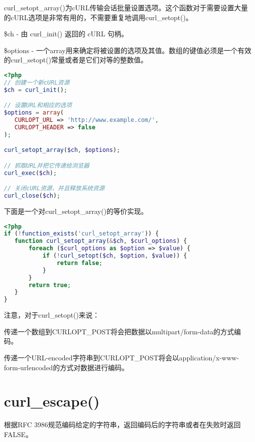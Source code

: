 curl\_setopt\_array()为cURL传输会话批量设置选项。这个函数对于需要设置大量的cURL选项是非常有用的，不需要重复地调用curl\_setopt()。

\begin{compactitem}
\item \$ch - 由 curl\_init() 返回的 cURL 句柄。

\item \$options - 一个array用来确定将被设置的选项及其值。数组的键值必须是一个有效的curl\_setopt()常量或者是它们对等的整数值。
\end{compactitem}

\begin{lstlisting}[language=PHP]
<?php
// 创建一个新cURL资源
$ch = curl_init();

// 设置URL和相应的选项
$options = array(
   CURLOPT_URL => 'http://www.example.com/',
   CURLOPT_HEADER => false
);

curl_setopt_array($ch, $options);

// 抓取URL并把它传递给浏览器
curl_exec($ch);

// 关闭cURL资源，并且释放系统资源
curl_close($ch);
\end{lstlisting}

下面是一个对curl\_setopt\_array()的等价实现。

\begin{lstlisting}[language=PHP]
<?php
if (!function_exists('curl_setopt_array')) {
   function curl_setopt_array(&$ch, $curl_options) {
       foreach ($curl_options as $option => $value) {
           if (!curl_setopt($ch, $option, $value)) {
               return false;
           } 
       }
       return true;
   }
}
\end{lstlisting}


注意，对于curl\_setopt()来说：

\begin{compactitem}
\item 传递一个数组到CURLOPT\_POST将会把数据以multipart/form-data的方式编码。
\item 传递一个URL-encoded字符串到CURLOPT\_POST将会以application/x-www-form-urlencoded的方式对数据进行编码。
\end{compactitem}


\section{curl\_escape()}


根据RFC 3986规范编码给定的字符串，返回编码后的字符串或者在失败时返回 FALSE。

